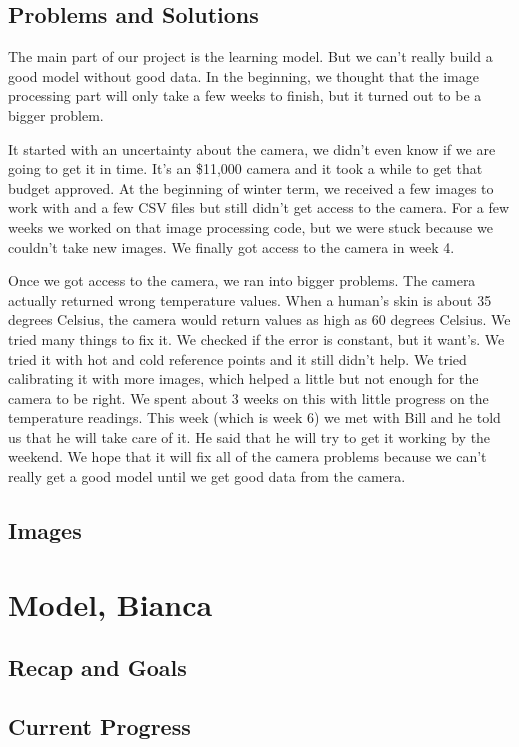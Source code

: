 \documentclass[onecolumn, draftclsnofoot,10pt, compsoc]{IEEEtran}
\begin{document}
\subsection{Problems and Solutions}
The main part of our project is the learning model. But we can’t really build a good model without good data. In the beginning, we thought that the image processing part will only take a few weeks to finish, but it turned out to be a bigger problem. 


It started with an uncertainty about the camera, we didn’t even know if we are going to get it in time. It’s an \$11,000 camera and it took a while to get that budget approved. At the beginning of winter term, we received a few images to work with and a few CSV files but still didn’t get access to the camera. For a few weeks we worked on that image processing code, but we were stuck because we couldn’t take new images. We finally got access to the camera in week 4. 

Once we got access to the camera, we ran into bigger problems. The camera actually returned wrong temperature values. When a human’s skin is about 35 degrees Celsius, the camera would return values as high as 60 degrees Celsius.  We tried many things to fix it. We checked if the error is constant, but it want’s.  We tried it with hot and cold reference points and it still didn’t help. We tried calibrating it with more images, which helped a little but not enough for the camera to be right. We spent about 3 weeks on this with little progress on the temperature readings. This week (which is week 6) we met with Bill and he told us that he will take care of it. He said that he will try to get it working by the weekend. We hope that it will fix all of the camera problems because we can’t really get a good model until we get good data from the camera.\cite{ClaudeTech}

\subsection{Images}


\section{Model, Bianca}

\subsection{Recap and Goals}


\subsection{Current Progress}
\end{document}
